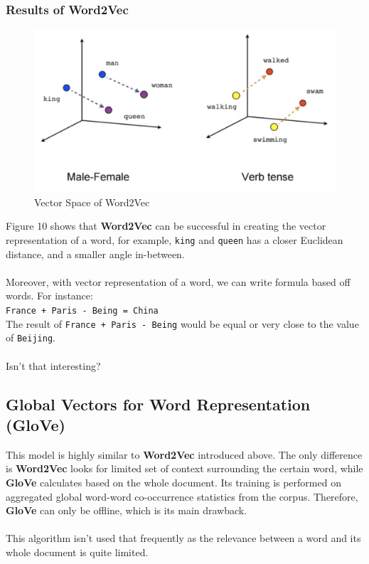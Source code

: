 \documentclass[paper=a4, fontsize=12pt]{scrartcl}
\begin{document}
\subsubsection{Results of Word2Vec}
 \begin{figure}
  \includegraphics[scale=0.7]{word2vectorresult.png}
  \caption{Vector Space of Word2Vec}
  \label{fig:skip-gram}
\end{figure}
Figure 10 shows that \textbf{Word2Vec} can be successful in creating the vector representation of a word, for example, \texttt{king} and \texttt{queen} has a closer Euclidean distance, and a smaller angle in-between.\\\\
Moreover, with vector representation of a word, we can write formula based off words. For instance: \\
\texttt{France + Paris - Being = China} \\
The result of \texttt{France + Paris - Being} would be equal or very close to the value of   \texttt{Beijing}. \\\\
Isn't that interesting?
\subsection{Global Vectors for Word Representation (GloVe)}
This model is highly similar to \textbf{Word2Vec} introduced above. The only difference is \textbf{Word2Vec} looks for limited set of context surrounding the certain word, while \textbf{GloVe} calculates based on the whole document. Its training is performed on aggregated global word-word co-occurrence statistics from the corpus. Therefore, \textbf{GloVe} can only be offline, which is its main drawback. \\\\
This algorithm isn't used that frequently as the relevance between a word and its whole document is quite limited. 
\end{document}
